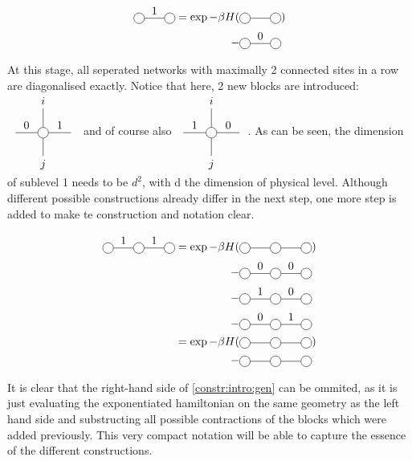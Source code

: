 \begin{equation}
    \begin{split}
        \mpob{2}{ {0,1,0}  }{}{}{}{{"",}}  = \exp -\beta H( & \mpob{2}{ {,,} }{}{}{}{{"",}})  \\
        - &\mpob{2}{ {0,0,0}  }{}{}{}{{"",}}
    \end{split}
\end{equation}

At this stage, all seperated networks with maximally 2 connected sites in a row are diagonalised exactly. Notice that here, 2  new blocks are introduced: $\mpo{1}{ {0,1}  }{ {"$i$",}  }{ {"$j$",}}{}{{"",}}$ and of course also $\mpo{1}{ {1,0}  }{ {"$i$",}  }{ {"$j$",}}{}{{"",}}$. As can be seen, the dimension of sublevel 1 needs to be $d^2$, with d the dimension of physical level. Although different possible constructions already differ in the next step, one more step is added to make te construction and notation clear.

\begin{equation}\label{constr:intro:gen}
    \begin{split}
        \mpob{3}{ {0,1,1,0}  }{}{}{}{{,,,}}  = \exp  -\beta H( &\mpob{3}{ {,,,} }{}{}{}{{,,}})  \\
        -&\mpob{3}{ {0,0,0,0}  }{}{}{}{{,,,}}\\
        -&\mpob{3}{ {0,1,0,0}  }{}{}{}{{,,,}}\\
        -&\mpob{3}{ {0,0,1,0}  }{}{}{}{{,,,}}\\
        =\exp  -\beta H( &\mpob{3}{ {,,,} }{}{}{}{{,,}})\\
        -&\mpob{3}{ {,,,}  }{}{}{}{{,,,}}\\
    \end{split}
\end{equation}

It is clear that the right-hand side of \cref{constr:intro:gen} can be ommited, as it is just evaluating the exponentiated hamiltonian on the same geometry as the left hand side and substructing all possible contractions of the blocks which were added previously. This very compact notation will be able to capture the essence of the different constructions.
